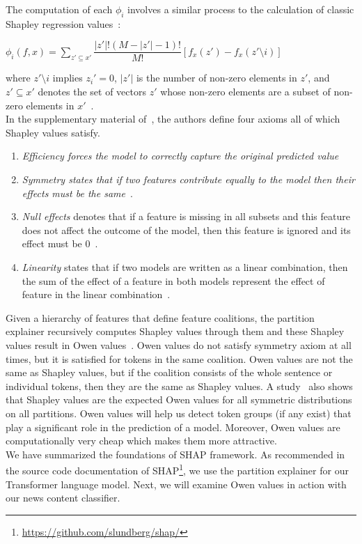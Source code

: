 The computation of each $\phi_i$ involves a similar process to the calculation of classic Shapley regression values~\parencite{AnalysisOfRegressionInGameTheory_Lipovetsky}:
\begin{center}
    $\phi_i(f, x ) = \sum\limits_{z' \subseteq x'} \dfrac{|z'|! (M - |z'| - 1)!}{M!} [f_x(z') - f_x(z' \setminus i)]$
\end{center}
where $z' \setminus i$ implies $z_i' = 0$, $|z'|$ is the number of non-zero elements in $z'$, and $z' \subseteq x'$ denotes the set of vectors $z'$ whose non-zero elements are a subset of non-zero elements in $x'$~\parencite{AUnifiedApproach_Lundberg}.\\
In the supplementary material of~\cite{AUnifiedApproach_Lundberg}, the authors define four axioms all of which Shapley values satisfy.
\begin{enumerate}
    \item \emph{Efficiency forces the model to correctly capture the original predicted value}~\parencite{AUnifiedApproach_Lundberg}
    \item \emph{Symmetry states that if two features contribute equally to the model then their effects must be the same}~\parencite{AUnifiedApproach_Lundberg}.
    \item \emph{Null effects} denotes that if a feature is missing in all subsets and this feature does not affect the outcome of the model, then this feature is ignored and its effect must be 0~\parencite{AUnifiedApproach_Lundberg}.
    \item \emph{Linearity} states that if two models are written as a linear combination, then the sum of the effect of a feature in both models represent the effect of feature in the linear combination~\parencite{AUnifiedApproach_Lundberg}.
\end{enumerate}
Given a hierarchy of features that define feature coalitions, the partition explainer recursively computes Shapley values through them and these Shapley values result in Owen values~\parencite{OwenValues_Owen}. Owen values do not satisfy symmetry axiom at all times, but it is satisfied for tokens in the same coalition. Owen values are not the same as Shapley values, but if the coalition consists of the whole sentence or individual tokens, then they are the same as Shapley values. A study~\parencite{TheOwenAndShapleyValue_Casajus} also shows that Shapley values are the expected Owen values for all symmetric distributions on all partitions. Owen values will help us detect token groups (if any exist) that play a significant role in the prediction of a model. Moreover, Owen values are computationally very cheap which makes them more attractive.\\
We have summarized the foundations of SHAP framework. As recommended in the source code documentation of SHAP\footnote{\url{https://github.com/slundberg/shap/}}, we use the partition explainer for our Transformer language model. Next, we will examine Owen values in action with our news content classifier.

